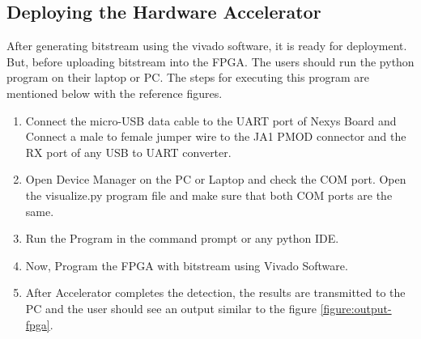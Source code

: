 \documentclass[a4paper,12pt,oneside]{book}
\begin{document}
\subsection*{Deploying the Hardware Accelerator}
After generating bitstream using the vivado software, it is ready for deployment. But, before uploading bitstream into the FPGA. The users should run the python program on their laptop or PC. The steps for executing this program are mentioned below with the reference figures.
\begin{enumerate}
    \item Connect the micro-USB data cable to the UART port of Nexys Board and Connect a male to female jumper wire to the JA1 PMOD connector and the RX port of any USB to UART converter.
    \item Open Device Manager on the PC or Laptop and check the COM port. Open the visualize.py program file and make sure that both COM ports are the same.
    \item Run the Program in the command prompt or any python IDE.
    \item Now, Program the FPGA with bitstream using Vivado Software.
    \item After Accelerator completes the detection, the results are transmitted to the PC and the user should see an output similar to the figure \ref{figure:output-fpga}.

\end{enumerate}
\end{document}
